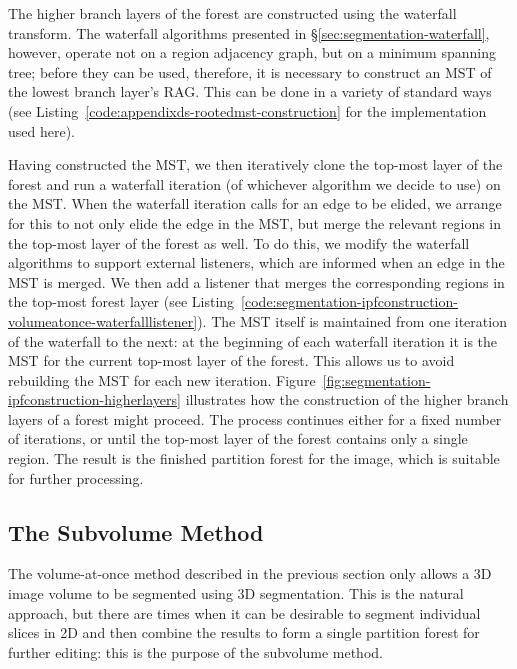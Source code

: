 The higher branch layers of the forest are constructed using the waterfall transform. The waterfall algorithms presented in \S\ref{sec:segmentation-waterfall}, however, operate not on a region adjacency graph, but on a minimum spanning tree; before they can be used, therefore, it is necessary to construct an MST of the lowest branch layer's RAG. This can be done in a variety of standard ways (see Listing~\ref{code:appendixds-rootedmst-construction} for the implementation used here).

Having constructed the MST, we then iteratively clone the top-most layer of the forest and run a waterfall iteration (of whichever algorithm we decide to use) on the MST. When the waterfall iteration calls for an edge to be elided, we arrange for this to not only elide the edge in the MST, but merge the relevant regions in the top-most layer of the forest as well. To do this, we modify the waterfall algorithms to support external listeners, which are informed when an edge in the MST is merged. We then add a listener that merges the corresponding regions in the top-most forest layer (see Listing~\ref{code:segmentation-ipfconstruction-volumeatonce-waterfalllistener}). The MST itself is maintained from one iteration of the waterfall to the next: at the beginning of each waterfall iteration it is the MST for the current top-most layer of the forest. This allows us to avoid rebuilding the MST for each new iteration. Figure~\ref{fig:segmentation-ipfconstruction-higherlayers} illustrates how the construction of the higher branch layers of a forest might proceed. The process continues either for a fixed number of iterations, or until the top-most layer of the forest contains only a single region. The result is the finished partition forest for the image, which is suitable for further processing.


\subsection{The Subvolume Method}
\label{subsec:segmentation-ipfconstruction-subvolume}


The volume-at-once method described in the previous section only allows a 3D image volume to be segmented using 3D segmentation. This is the natural approach, but there are times when it can be desirable to segment individual slices in 2D and then combine the results to form a single partition forest for further editing: this is the purpose of the subvolume method.

